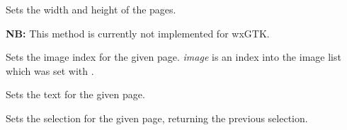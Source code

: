 Sets the width and height of the pages.

{\bf NB:} This method is currently not implemented for wxGTK.

\label{wxnotebooksetpageimage}


Sets the image index for the given page. {\it image} is an index into
the image list which was set with .

\label{wxnotebooksetpagetext}


Sets the text for the given page.

\label{wxnotebooksetselection}


Sets the selection for the given page, returning the previous selection.




